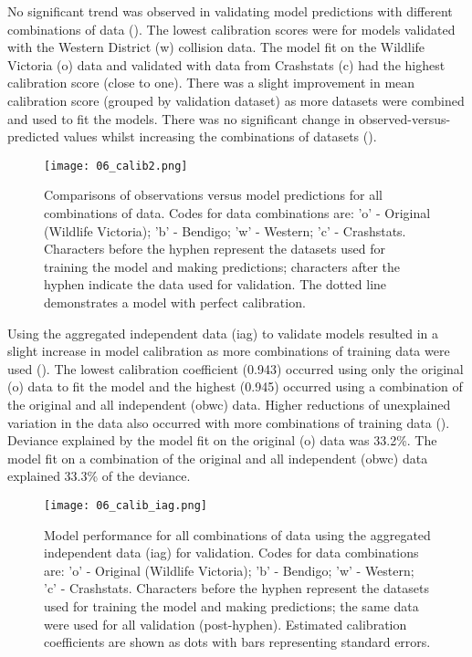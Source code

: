 No significant trend was observed in validating model predictions with different combinations of data (). The lowest calibration scores were for models validated with the Western District (w) collision data. The model fit on the Wildlife Victoria (o) data and validated with data from Crashstats (c) had the highest calibration score (close to one). There was a slight improvement in mean calibration score (grouped by validation dataset) as more datasets were combined and used to fit the models. There was no significant change in observed-versus-predicted values whilst increasing the combinations of datasets ().

\begin{figure*}[htp]
  \centering
  \texttt{[image: 06\_calib2.png]}
  \caption[Comparisons of observations versus model predictions for all combinations of original and independent data]{Comparisons of observations versus model predictions for all combinations of data. Codes for data combinations are: 'o' - Original (Wildlife Victoria); 'b' - Bendigo; 'w' - Western; 'c' - Crashstats. Characters before the hyphen represent the datasets used for training the model and making predictions; characters after the hyphen indicate the data used for validation. The dotted line demonstrates a model with perfect calibration.}
  \label{val_calib2}
\end{figure*}

Using the aggregated independent data (iag) to validate models resulted in a slight increase in model calibration as more combinations of training data were used ().  The lowest calibration coefficient (0.943) occurred using only the original (o) data to fit the model and the highest (0.945) occurred using a combination of the original and all independent (obwc) data. Higher reductions of unexplained variation in the data also occurred with more combinations of training data (). Deviance explained by the model fit on the original (o) data was 33.2\%. The model fit on a combination of the original and all independent (obwc) data explained 33.3\% of the deviance.

\begin{figure*}[htp]
  \centering
  \texttt{[image: 06\_calib\_iag.png]}
  \caption[Model calibration for all combinations of training data using the aggregated independent data for validation]{Model performance for all combinations of data using the aggregated independent data (iag) for validation. Codes for data combinations are: 'o' - Original (Wildlife Victoria); 'b' - Bendigo; 'w' - Western; 'c' - Crashstats. Characters before the hyphen represent the datasets used for training the model and making predictions; the same data were used for all validation (post-hyphen). Estimated calibration coefficients are shown as dots with bars representing standard errors.}
  \label{val_calib_iag}
\end{figure*}

